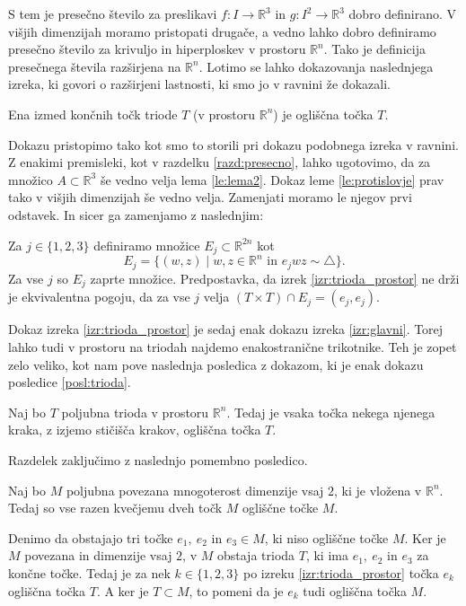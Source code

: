 \documentclass[mat1]{fmfdelo}
\newcommand{\R}{\mathbb R}
\begin{document}
S tem je presečno število za preslikavi $f \colon I \to \R^3$ in $g \colon I^2 \to \R^3$ dobro definirano. V višjih dimenzijah moramo pristopati drugače, a vedno lahko dobro definiramo presečno število za krivuljo in hiperploskev v prostoru $\R^n$. Tako je definicija presečnega števila razširjena na $\R^n$. Lotimo se lahko dokazovanja naslednjega izreka, ki govori o razširjeni lastnosti, ki smo jo v ravnini že dokazali.

\begin{izrek}\label{izr:trioda_prostor}
Ena izmed končnih točk triode $T$ (v prostoru $\R^n$) je ogliščna točka $T$.
\end{izrek} 

Dokazu pristopimo tako kot smo to storili pri dokazu podobnega izreka v ravnini. Z enakimi premisleki, kot v razdelku \ref{razd:presecno}, lahko ugotovimo, da za množico $A \subset \R^3$ še vedno velja lema \ref{le:lema2}. Dokaz leme \ref{le:protislovje} prav tako v višjih dimenzijah še vedno velja. Zamenjati moramo le njegov prvi odstavek. In sicer ga zamenjamo z  naslednjim:

Za $j \in \{1, 2, 3\}$ definiramo množice $E_j \subset \R^{2n}$ kot 
\[
E_j = \{ (w, z) \mid w, z \in \R^n \text{ in } e_jwz \sim \triangle \}.
\] 
Za vse $j$ so $E_j$ zaprte množice. Predpostavka, da izrek \ref{izr:trioda_prostor} ne drži je ekvivalentna pogoju, da za vse $j$ velja $(T \times T) \cap E_j = (e_j, e_j)$.

Dokaz izreka \ref{izr:trioda_prostor} je sedaj enak dokazu izreka \ref{izr:glavni}. Torej lahko tudi v prostoru na triodah najdemo enakostranične trikotnike. Teh je zopet zelo veliko, kot nam pove naslednja posledica z dokazom, ki je enak dokazu posledice \ref{posl:trioda}.

\begin{posledica}
Naj bo $T$ poljubna trioda v prostoru $\R^n$. Tedaj je vsaka točka nekega njenega kraka, z izjemo stičišča krakov, ogliščna točka $T$.
\end{posledica}

Razdelek zaključimo z naslednjo pomembno posledico.

\begin{posledica}
Naj bo $M$ poljubna povezana mnogoterost dimenzije vsaj $2$, ki je vložena v $\R^n$. Tedaj so vse razen kvečjemu dveh točk $M$ ogliščne točke $M$.
\end{posledica}

\proof
Denimo da obstajajo tri točke $e_1,\ e_2$ in $e_3 \in M$, ki niso ogliščne točke $M$. Ker je $M$ povezana in dimenzije vsaj $2$, v $M$ obstaja trioda $T$, ki ima $e_1,\ e_2$ in $e_3$ za končne točke. Tedaj je za nek $k \in \{1, 2, 3\}$ po izreku \ref{izr:trioda_prostor} točka $e_k$ ogliščna točka $T$. A ker je $T \subset M$, to pomeni da je $e_k$ tudi ogliščna točka $M$.
\endproof
\end{document}
